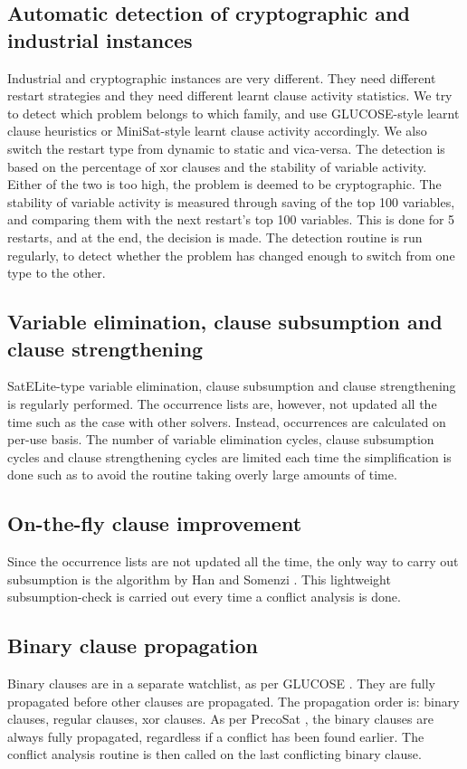 \documentclass[final]{ieee}
\begin{document}
\subsection{Automatic detection of cryptographic and industrial instances}
Industrial and cryptographic instances are very different. They need different restart strategies and they need different learnt clause activity statistics. We try to detect which problem belongs to which family, and use GLUCOSE-style learnt clause heuristics \cite{DBLP:conf/ijcai/AudemardS09} or MiniSat-style learnt clause activity accordingly. We also switch the restart type from dynamic to static and vica-versa. The detection is based on the percentage of xor clauses and the stability of variable activity. Either of the two is too high, the problem is deemed to be cryptographic. The stability of variable activity is measured through saving of the top 100 variables, and comparing them with the next restart's top 100 variables. This is done for 5 restarts, and at the end, the decision is made. The detection routine is run regularly, to detect whether the problem has changed enough to switch from one type to the other.

\subsection{Variable elimination, clause subsumption and clause strengthening}
SatELite-type variable elimination, clause subsumption and clause strengthening is regularly performed. The occurrence lists are, however, not updated all the time such as the case with other solvers. Instead, occurrences are calculated on per-use basis. The number of variable elimination cycles, clause subsumption cycles and clause strengthening cycles are limited each time the simplification is done such as to avoid the routine taking overly large amounts of time.

\subsection{On-the-fly clause improvement}
Since the occurrence lists are not updated all the time, the only way to carry out subsumption is the algorithm by Han and Somenzi \cite{DBLP:conf/sat/HanS09}. This lightweight subsumption-check is carried out every time a conflict analysis is done.

\subsection{Binary clause propagation}
Binary clauses are in a separate watchlist, as per GLUCOSE \cite{glucose}. They are fully propagated before other clauses are propagated. The propagation order is: binary clauses, regular clauses, xor clauses. As per PrecoSat \cite{precosat}, the binary clauses are always fully propagated, regardless if a conflict has been found earlier. The conflict analysis routine is then called on the last conflicting binary clause.
\end{document}
